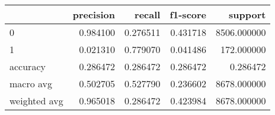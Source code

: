\begin{tabular}{lrrrr}
\toprule
{} &  precision &    recall &  f1-score &      support \\
\midrule
0            &   0.984100 &  0.276511 &  0.431718 &  8506.000000 \\
1            &   0.021310 &  0.779070 &  0.041486 &   172.000000 \\
accuracy     &   0.286472 &  0.286472 &  0.286472 &     0.286472 \\
macro avg    &   0.502705 &  0.527790 &  0.236602 &  8678.000000 \\
weighted avg &   0.965018 &  0.286472 &  0.423984 &  8678.000000 \\
\bottomrule
\end{tabular}
